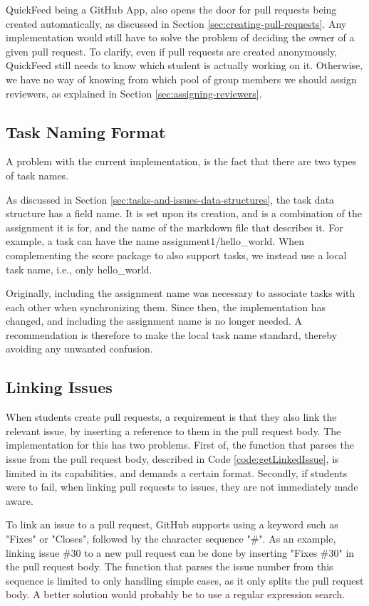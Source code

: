 QuickFeed being a GitHub App, also opens the door for pull requests being created automatically, as discussed in Section \ref{sec:creating-pull-requests}.
Any implementation would still have to solve the problem of deciding the owner of a given pull request.
To clarify, even if pull requests are created anonymously, QuickFeed still needs to know which student is actually working on it.
Otherwise, we have no way of knowing from which pool of group members we should assign reviewers, as explained in Section \ref{sec:assigning-reviewers}.

\subsection{Task Naming Format}

A problem with the current implementation, is the fact that there are two types of task names.

As discussed in Section \ref{sec:tasks-and-issues-data-structures}, the task data structure has a field name.
It is set upon its creation, and is a combination of the assignment it is for, and the name of the markdown file that describes it.
For example, a task can have the name assignment1/hello\_world.
When complementing the score package to also support tasks, we instead use a local task name, i.e., only hello\_world.

Originally, including the assignment name was necessary to associate tasks with each other when synchronizing them.
Since then, the implementation has changed, and including the assignment name is no longer needed.
A recommendation is therefore to make the local task name standard, thereby avoiding any unwanted confusion.

\subsection{Linking Issues}
\label{sec:linking-issues}

When students create pull requests, a requirement is that they also link the relevant issue, by inserting a reference to them in the pull request body.
The implementation for this has two problems.
First of, the function that parses the issue from the pull request body, described in Code \ref{code:getLinkedIssue}, is limited in its capabilities, and demands a certain format.
Secondly, if students were to fail, when linking pull requests to issues, they are not immediately made aware.

To link an issue to a pull request, GitHub supports using a keyword such as "Fixes" or "Closes", followed by the character sequence "\#<issue number>".
As an example, linking issue \#30 to a new pull request can be done by inserting "Fixes \#30" in the pull request body.
The function that parses the issue number from this sequence is limited to only handling simple cases, as it only splits the pull request body.
A better solution would probably be to use a regular expression search.

